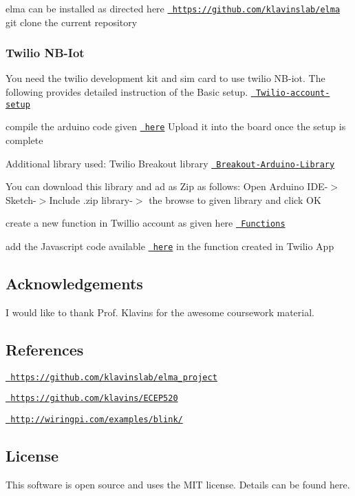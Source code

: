 elma can be installed as directed here \href{https://github.com/klavinslab/elma}{\texttt{ https\+://github.\+com/klavinslab/elma}} git clone the current repository


\begin{DoxyCode}{0}
\end{DoxyCode}


\subsubsection*{Twilio N\+B-\/\+Iot}

You need the twilio development kit and sim card to use twilio N\+B-\/iot. The following provides detailed instruction of the Basic setup. \href{https://www.twilio.com/docs/wireless/tutorials/apn-configuration}{\texttt{ Twilio-\/account-\/setup}}

compile the arduino code given \href{https://github.com/ForumSuthar/SmsUpdates/tree/master/arduino}{\texttt{ here}} Upload it into the board once the setup is complete

Additional library used\+: Twilio Breakout library \href{https://github.com/twilio/Breakout_Arduino_Library}{\texttt{ Breakout-\/\+Arduino-\/\+Library}}

You can download this library and ad as Zip as follows\+: Open Arduino I\+D\+E-\/$>$ Sketch-\/$>$Include .zip library-\/$>$ the browse to given library and click OK

create a new function in Twillio account as given here \href{https://www.twilio.com/docs/runtime/functions}{\texttt{ Functions}}

add the Javascript code available \href{https://github.com/ForumSuthar/SmsUpdates/tree/master/Twilio}{\texttt{ here}} in the function created in Twilio App

\subsection*{Acknowledgements}

I would like to thank Prof. Klavins for the awesome coursework material.

\subsection*{References}

\href{https://github.com/klavinslab/elma_project}{\texttt{ https\+://github.\+com/klavinslab/elma\+\_\+project}}

\href{https://github.com/klavins/ECEP520}{\texttt{ https\+://github.\+com/klavins/\+E\+C\+E\+P520}}

\href{http://wiringpi.com/examples/blink/}{\texttt{ http\+://wiringpi.\+com/examples/blink/}}

\subsection*{License}

This software is open source and uses the M\+IT license. Details can be found here. 